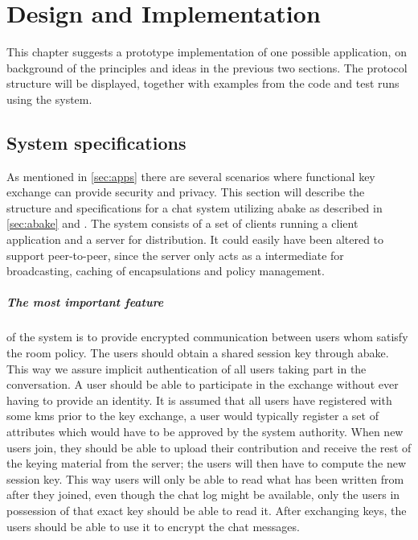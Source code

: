 \chapter{Design and Implementation}\label{chp:designimpl}
This chapter suggests a prototype implementation of one possible application, on background of the principles and ideas in the previous two sections. The protocol structure will be displayed, together with examples from the code and test runs using the system.

\section{System specifications}\label{sec:chat}
As mentioned in \ref{sec:apps} there are several scenarios where functional key exchange can provide security and privacy. This section will describe the structure and specifications for a chat system utilizing \gls{abake} as described in \ref{sec:abake} and \cite{DBLP:abake}. The system consists of a set of clients running a client application and a server for distribution. It could easily have been altered to support peer-to-peer, since the server only acts as a intermediate for broadcasting, caching of encapsulations and policy management. 
\paragraph{The most important feature} of the system is to provide encrypted communication between users whom satisfy the room policy. The users should obtain a shared session key through \gls{abake}. This way we assure implicit authentication of all users taking part in the conversation. A user should be able to participate in the exchange without ever having to provide an identity. It is assumed that all users have registered with some \gls{kms} prior to the key exchange, a user would typically register a set of attributes which would have to be approved by the system authority. When new users join, they should be able to upload their contribution and receive the rest of the keying material from the server; the users will then have to compute the new session key. This way users will only be able to read what has been written from after they joined, even though the chat log might be available, only the users in possession of that exact key should be able to read it. After exchanging keys, the users should be able to use it to encrypt the chat messages. 

